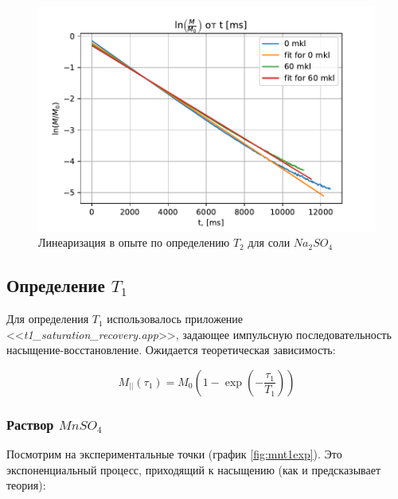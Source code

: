 \begin{figure}[!h]
	\hspace{-5em}
	\includegraphics[width=1.2\linewidth]{data/Na_T_2_reg}
	\caption{Линеаризация в опыте по определению $ T_2 $ для соли $ Na_2 SO_4 $}
	\label{fig:nat2reg}
\end{figure}

\subsection{Определение $ T_1 $}
Для определения $ T_1 $ использовалось приложение <<\textit{t1\_saturation\_recovery.app}>>, задающее импульсную последовательность насыщение-восстановление. Ожидается теоретическая зависимость:

\begin{equation}
\label{eq:M_parall-from-T1}
M_{||} (\tau_1) = M_0 \left(1 - \exp \left( -\dfrac{\tau_1}{T_1} \right) \right)
\end{equation}

\subsubsection{Раствор $ Mn SO_4 $}
Посмотрим на экспериментальные точки (график \ref{fig:mnt1exp}). Это экспоненциальный процесс, приходящий к насыщению (как и предсказывает теория):

